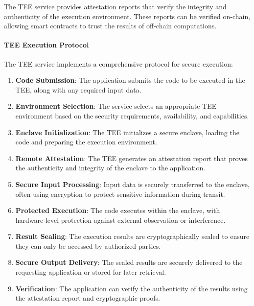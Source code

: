 The TEE service provides attestation reports that verify the integrity and authenticity of the execution environment. These reports can be verified on-chain, allowing smart contracts to trust the results of off-chain computations.

\paragraph{TEE Execution Protocol}
The TEE service implements a comprehensive protocol for secure execution:

\begin{enumerate}
    \item \textbf{Code Submission}: The application submits the code to be executed in the TEE, along with any required input data.
    
    \item \textbf{Environment Selection}: The service selects an appropriate TEE environment based on the security requirements, availability, and capabilities.
    
    \item \textbf{Enclave Initialization}: The TEE initializes a secure enclave, loading the code and preparing the execution environment.
    
    \item \textbf{Remote Attestation}: The TEE generates an attestation report that proves the authenticity and integrity of the enclave to the application.
    
    \item \textbf{Secure Input Processing}: Input data is securely transferred to the enclave, often using encryption to protect sensitive information during transit.
    
    \item \textbf{Protected Execution}: The code executes within the enclave, with hardware-level protection against external observation or interference.
    
    \item \textbf{Result Sealing}: The execution results are cryptographically sealed to ensure they can only be accessed by authorized parties.
    
    \item \textbf{Secure Output Delivery}: The sealed results are securely delivered to the requesting application or stored for later retrieval.
    
    \item \textbf{Verification}: The application can verify the authenticity of the results using the attestation report and cryptographic proofs.
\end{enumerate}

